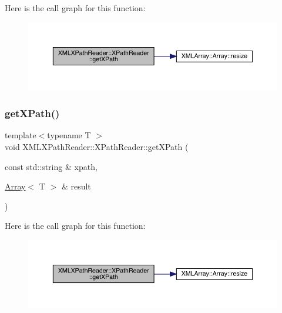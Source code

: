 Here is the call graph for this function\+:
\nopagebreak
\begin{figure}[H]
\begin{center}
\leavevmode
\includegraphics[width=350pt]{d3/d5a/classXMLXPathReader_1_1XPathReader_a2c16b804ab7842a5bab7a8fe3f433437_cgraph}
\end{center}
\end{figure}
\mbox{\label{classXMLXPathReader_1_1XPathReader_a2c16b804ab7842a5bab7a8fe3f433437}} 
\subsubsection{\texorpdfstring{getXPath()}{getXPath()}\hspace{0.1cm}{\footnotesize\ttfamily [8/9]}}
{\footnotesize\ttfamily template$<$typename T $>$ \\
void X\+M\+L\+X\+Path\+Reader\+::\+X\+Path\+Reader\+::get\+X\+Path (\begin{DoxyParamCaption}\item[{const std\+::string \&}]{xpath,  }\item[{\mbox{\hyperlink{classXMLArray_1_1Array}{Array}}$<$ T $>$ \&}]{result }\end{DoxyParamCaption})\hspace{0.3cm}{\ttfamily [inline]}}

Here is the call graph for this function\+:
\nopagebreak
\begin{figure}[H]
\begin{center}
\leavevmode
\includegraphics[width=350pt]{d3/d5a/classXMLXPathReader_1_1XPathReader_a2c16b804ab7842a5bab7a8fe3f433437_cgraph}
\end{center}
\end{figure}
\mbox{\label{classXMLXPathReader_1_1XPathReader_a2c16b804ab7842a5bab7a8fe3f433437}} 
